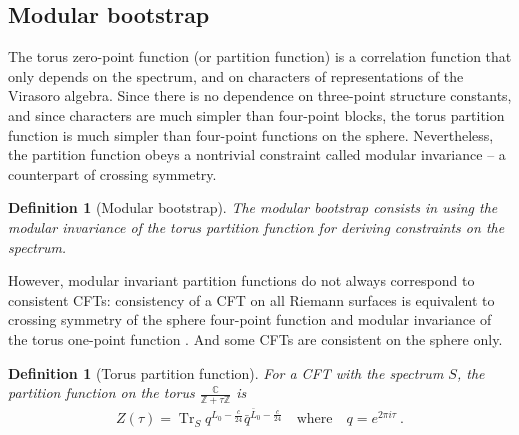 \documentclass[12pt, a4paper]{article}
\theoremstyle{break}
\newtheorem{defn}[exo]{Definition}
\begin{document}
\subsection{Modular bootstrap}

The torus zero-point function (or partition function) is a correlation function that only depends on the spectrum, and on characters of representations of the Virasoro algebra. Since there is no dependence on three-point structure constants, and since characters are much simpler than four-point blocks, the torus partition function is much simpler than four-point functions on the sphere. Nevertheless, the partition function obeys a nontrivial constraint called modular invariance -- a counterpart of crossing symmetry.

\begin{defn}[Modular bootstrap]
The modular bootstrap consists in using the modular invariance of the torus partition function for deriving constraints on the spectrum.
\end{defn}
However, modular invariant partition functions do not always correspond to consistent CFTs: consistency of a CFT on all Riemann surfaces is equivalent to crossing symmetry of the sphere four-point function and modular invariance of the torus one-point function \cite{ms89b}. And some CFTs are consistent on the sphere only.

\begin{defn}[Torus partition function]
 For a CFT with the spectrum $S$, the partition function on the torus $\frac{\mathbb{C}}{\mathbb{Z}+\tau \mathbb{Z}}$ is 
 \begin{align}
  Z(\tau) = \operatorname{Tr}_S q^{L_0-\frac{c}{24}}\bar q^{\bar L_0-\frac{c}{24}}\quad \text{where} \quad q=e^{2\pi i \tau}\ .
 \end{align}
\end{defn}
\end{document}
